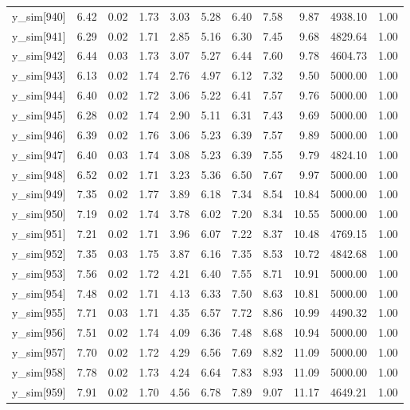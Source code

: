 \begin{table}[ht]
\begin{tabular}{rrrrrrrrrrr}
  y\_sim[940] & 6.42 & 0.02 & 1.73 & 3.03 & 5.28 & 6.40 & 7.58 & 9.87 & 4938.10 & 1.00 \\ 
  y\_sim[941] & 6.29 & 0.02 & 1.71 & 2.85 & 5.16 & 6.30 & 7.45 & 9.68 & 4829.64 & 1.00 \\ 
  y\_sim[942] & 6.44 & 0.03 & 1.73 & 3.07 & 5.27 & 6.44 & 7.60 & 9.78 & 4604.73 & 1.00 \\ 
  y\_sim[943] & 6.13 & 0.02 & 1.74 & 2.76 & 4.97 & 6.12 & 7.32 & 9.50 & 5000.00 & 1.00 \\ 
  y\_sim[944] & 6.40 & 0.02 & 1.72 & 3.06 & 5.22 & 6.41 & 7.57 & 9.76 & 5000.00 & 1.00 \\ 
  y\_sim[945] & 6.28 & 0.02 & 1.74 & 2.90 & 5.11 & 6.31 & 7.43 & 9.69 & 5000.00 & 1.00 \\ 
  y\_sim[946] & 6.39 & 0.02 & 1.76 & 3.06 & 5.23 & 6.39 & 7.57 & 9.89 & 5000.00 & 1.00 \\ 
  y\_sim[947] & 6.40 & 0.03 & 1.74 & 3.08 & 5.23 & 6.39 & 7.55 & 9.79 & 4824.10 & 1.00 \\ 
  y\_sim[948] & 6.52 & 0.02 & 1.71 & 3.23 & 5.36 & 6.50 & 7.67 & 9.97 & 5000.00 & 1.00 \\ 
  y\_sim[949] & 7.35 & 0.02 & 1.77 & 3.89 & 6.18 & 7.34 & 8.54 & 10.84 & 5000.00 & 1.00 \\ 
  y\_sim[950] & 7.19 & 0.02 & 1.74 & 3.78 & 6.02 & 7.20 & 8.34 & 10.55 & 5000.00 & 1.00 \\ 
  y\_sim[951] & 7.21 & 0.02 & 1.71 & 3.96 & 6.07 & 7.22 & 8.37 & 10.48 & 4769.15 & 1.00 \\ 
  y\_sim[952] & 7.35 & 0.03 & 1.75 & 3.87 & 6.16 & 7.35 & 8.53 & 10.72 & 4842.68 & 1.00 \\ 
  y\_sim[953] & 7.56 & 0.02 & 1.72 & 4.21 & 6.40 & 7.55 & 8.71 & 10.91 & 5000.00 & 1.00 \\ 
  y\_sim[954] & 7.48 & 0.02 & 1.71 & 4.13 & 6.33 & 7.50 & 8.63 & 10.81 & 5000.00 & 1.00 \\ 
  y\_sim[955] & 7.71 & 0.03 & 1.71 & 4.35 & 6.57 & 7.72 & 8.86 & 10.99 & 4490.32 & 1.00 \\ 
  y\_sim[956] & 7.51 & 0.02 & 1.74 & 4.09 & 6.36 & 7.48 & 8.68 & 10.94 & 5000.00 & 1.00 \\ 
  y\_sim[957] & 7.70 & 0.02 & 1.72 & 4.29 & 6.56 & 7.69 & 8.82 & 11.09 & 5000.00 & 1.00 \\ 
  y\_sim[958] & 7.78 & 0.02 & 1.73 & 4.24 & 6.64 & 7.83 & 8.93 & 11.09 & 5000.00 & 1.00 \\ 
  y\_sim[959] & 7.91 & 0.02 & 1.70 & 4.56 & 6.78 & 7.89 & 9.07 & 11.17 & 4649.21 & 1.00 \\ 

\end{tabular}
\end{table}

